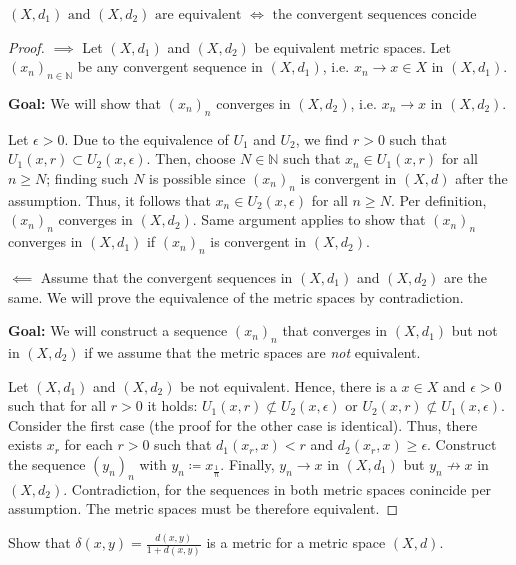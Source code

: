 \documentclass[a4paper]{article}
\renewcommand{\hline}{\noindent\makebox[\linewidth]{\rule{12cm}{1pt}}}
\begin{document}
\begin{issue}{}{}
$(X,d_1) \text{ and } (X,d_2) \text{ are equivalent } \iff \text{ the convergent sequences concide}$
\end{issue}
\begin{proof}
$\implies$ Let $(X,d_1)$ and $(X,d_2)$ be equivalent metric spaces. Let $(x_n)_{n \in \mathbb N}$ be any convergent sequence in $(X,d_1)$, i.e. $x_n \to x \in X$ in $(X,d_1)$. 

\textbf{Goal:} We will show that $(x_n)_n$ converges in $(X,d_2)$, i.e. $x_n \to x$ in $(X,d_2)$.

Let $\epsilon > 0$. Due to the equivalence of $U_1$ and $U_2$, we find $r > 0$ such that $U_1(x,r) \subset U_2(x,\epsilon)$. Then, choose $N \in \mathbb N$ such that $x_n \in U_1(x, r)$ for all $n \geq N$; finding such $N$ is possible since $(x_n)_n$ is convergent in $(X,d)$ after the assumption. Thus, it follows that $x_n \in U_2(x, \epsilon)$ for all $n \geq N$. Per definition, $(x_n)_n$ converges in $(X,d_2)$. Same argument applies to show that $(x_n)_n$ converges in $(X,d_1)$ if  $(x_n)_n$ is convergent in $(X,d_2)$.

$\impliedby$ Assume that the convergent sequences in $(X,d_1)$ and $(X,d_2)$ are the same. We will prove the equivalence of the metric spaces by contradiction.

\textbf{Goal:} We will construct a sequence $(x_n)_n$ that converges in $(X,d_1)$ but not in $(X,d_2)$ if we assume that the metric spaces are \emph{not} equivalent. 

Let $(X,d_1)$ and $(X,d_2)$ be not equivalent. Hence, there is a $x\in X$ and $\epsilon > 0$ such that for all $r > 0$ it holds: $U_1(x,r) \not \subset U_2(x, \epsilon)$ or $U_2(x,r) \not \subset U_1(x, \epsilon)$. Consider the first case (the proof for the other case is identical). Thus, there exists $x_r$ for each $r > 0$ such that $d_1(x_r,x) < r$ and $d_2(x_r,x) \geq \epsilon$. Construct the sequence $(y_n)_n$ with $y_n \coloneqq x_{\frac{1}{n}}$. Finally, $y_n \to x$ in $(X,d_1)$ but $y_n \not \to x$ in $(X,d_2)$. Contradiction, for the sequences in both metric spaces conincide per assumption. The metric spaces must be therefore equivalent.
\end{proof}

\hline


\begin{issue}{}{}
Show that $\delta(x,y) = \frac{d(x,y)}{1+d(x,y)}$ is a metric for a metric space $(X,d)$.
\end{issue}
\end{document}
